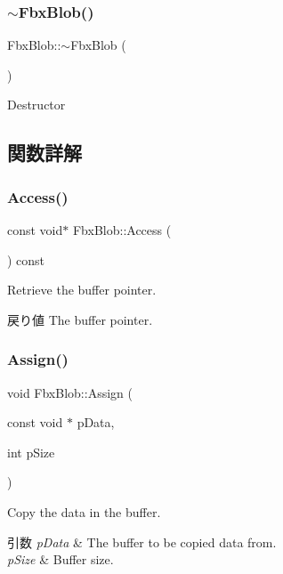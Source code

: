 \subsubsection{\texorpdfstring{$\sim$\+Fbx\+Blob()}{~FbxBlob()}}
{\footnotesize\ttfamily Fbx\+Blob\+::$\sim$\+Fbx\+Blob (\begin{DoxyParamCaption}{ }\end{DoxyParamCaption})}



Destructor 



\subsection{関数詳解}
\mbox{\label{class_fbx_blob_a5fb39826dd62378bcf18b4de9db38509}} 
\subsubsection{\texorpdfstring{Access()}{Access()}}
{\footnotesize\ttfamily const void$\ast$ Fbx\+Blob\+::\+Access (\begin{DoxyParamCaption}{ }\end{DoxyParamCaption}) const}

Retrieve the buffer pointer. \begin{DoxyReturn}{戻り値}
The buffer pointer. 
\end{DoxyReturn}
\mbox{\label{class_fbx_blob_a9370942703afba1f51798ff5ac2b0ec5}} 
\subsubsection{\texorpdfstring{Assign()}{Assign()}}
{\footnotesize\ttfamily void Fbx\+Blob\+::\+Assign (\begin{DoxyParamCaption}\item[{const void $\ast$}]{p\+Data,  }\item[{int}]{p\+Size }\end{DoxyParamCaption})}

Copy the data in the buffer. 
\begin{DoxyParams}{引数}
{\em p\+Data} & The buffer to be copied data from. \\
\hline
{\em p\+Size} & Buffer size. \\
\hline
\end{DoxyParams}
\mbox{\label{class_fbx_blob_abd720fef7ed5feacc8ef21d669e26cce}} 
